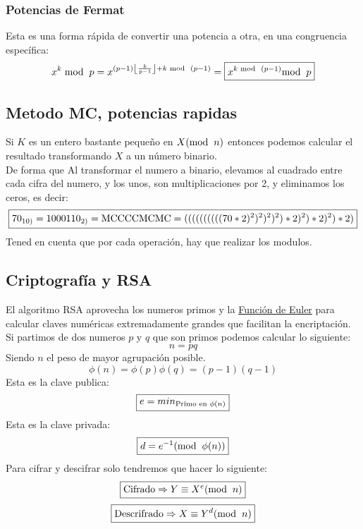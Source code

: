 \subsubsection{Potencias de Fermat}
\noindent Esta es una forma rápida de convertir una potencia a otra, en una congruencia específica:
\[
        x^k\hspace{1mm}\textnormal{mod}\hspace{2mm}p = x^{(p-1)\left \lfloor \frac{k}{p-1} \right \rfloor + k\hspace{1mm}\textnormal{mod}\hspace{2mm}(p-1)}=\boxed{x^{k\hspace{1mm}\textnormal{mod}\hspace{2mm}(p-1)}\textnormal{mod}\hspace{2mm}p}
\]
\subsection{Metodo MC, potencias rapidas}
\noindent Si \(K\) es un entero bastante pequeño en \(X (\textnormal{mod}\hspace{2mm}n)\) entonces podemos calcular el resultado transformando \(X\) a un número binario. \\De forma que Al transformar el numero a binario, elevamos al cuadrado entre cada cifra del numero, y los unos, son multiplicaciones por 2, y eliminamos los ceros, es decir:
\[
        \boxed{70_{10)} = 1000110_{2)} = \textnormal{M}\textnormal{C}\textnormal{C}\textnormal{C}\textnormal{C}\textnormal{M}\textnormal{C}\textnormal{M}\textnormal{C} = ((((((((((70*2)^2)^2)^2)^2)*2)^2)*2)^2)*2)}
\]
\noindent Tened en cuenta que por cada operación, hay que realizar los modulos.
\subsection{Criptografía y RSA}
\noindent El algoritmo RSA aprovecha los numeros primos y la \underline{Función de Euler} para calcular claves numéricas extremadamente grandes que facilitan la encriptación.\\ Si partimos de dos numeros \(p\) y \(q\) que son primos podemos calcular lo siguiente:
\[
        \boxed{n = pq}
\]
\noindent Siendo \(n\) el peso de mayor agrupación posible.
\[
        \boxed{\phi(n) = \phi(p)\phi(q) = (p-1)(q-1)}
\]
\noindent Esta es la clave publica:
\[
        \boxed{e = min_{\textnormal{Primo en \(\phi(n)\)}}}
\]
\noindent Esta es la clave privada:
\[
        \boxed{d = e^{-1} (\textnormal{mod} \hspace{2mm} \phi(n))}
\]
\noindent Para cifrar y descifrar solo tendremos que hacer lo siguiente:
\[
        \boxed{\textnormal{Cifrado}\Rightarrow  Y \equiv X^e (\textnormal{mod}\hspace{2mm}n)}
\]
\[
        \boxed{\textnormal{Descrifrado}\Rightarrow X \equiv Y^d (\textnormal{mod}\hspace{2mm}n)}
\]